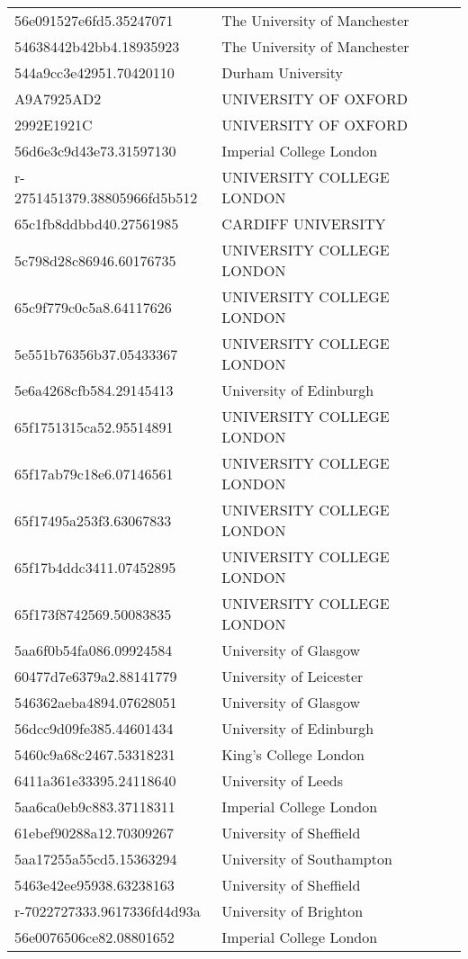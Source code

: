 \begin{tabular}{ll}
56e091527e6fd5.35247071 & The University of Manchester \\
54638442b42bb4.18935923 & The University of Manchester \\
544a9cc3e42951.70420110 & Durham University \\
A9A7925AD2 & UNIVERSITY OF OXFORD \\
2992E1921C & UNIVERSITY OF OXFORD \\
56d6e3c9d43e73.31597130 & Imperial College London \\
r-2751451379.38805966fd5b512 & UNIVERSITY COLLEGE LONDON \\
65c1fb8ddbbd40.27561985 & CARDIFF UNIVERSITY \\
5c798d28c86946.60176735 & UNIVERSITY COLLEGE LONDON \\
65c9f779c0c5a8.64117626 & UNIVERSITY COLLEGE LONDON \\
5e551b76356b37.05433367 & UNIVERSITY COLLEGE LONDON \\
5e6a4268cfb584.29145413 & University of Edinburgh \\
65f1751315ca52.95514891 & UNIVERSITY COLLEGE LONDON \\
65f17ab79c18e6.07146561 & UNIVERSITY COLLEGE LONDON \\
65f17495a253f3.63067833 & UNIVERSITY COLLEGE LONDON \\
65f17b4ddc3411.07452895 & UNIVERSITY COLLEGE LONDON \\
65f173f8742569.50083835 & UNIVERSITY COLLEGE LONDON \\
5aa6f0b54fa086.09924584 & University of Glasgow \\
60477d7e6379a2.88141779 & University of Leicester \\
546362aeba4894.07628051 & University of Glasgow \\
56dcc9d09fe385.44601434 & University of Edinburgh \\
5460c9a68c2467.53318231 & King's College London \\
6411a361e33395.24118640 & University of Leeds \\
5aa6ca0eb9c883.37118311 & Imperial College London \\
61ebef90288a12.70309267 & University of Sheffield \\
5aa17255a55cd5.15363294 & University of Southampton \\
5463e42ee95938.63238163 & University of Sheffield \\
r-7022727333.9617336fd4d93a & University of Brighton \\
56e0076506ce82.08801652 & Imperial College London \\

\end{tabular}
